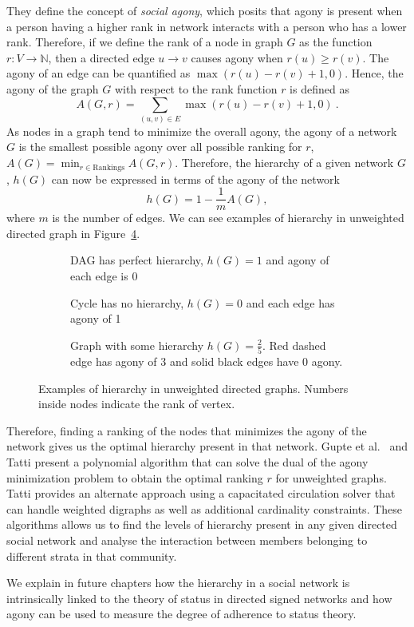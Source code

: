They define the concept of \textit{social agony}, which posits that agony is present when a person having a higher rank in network interacts with a person who has a lower rank.
Therefore, if we define the rank of a node in graph $G$ as the function $r:V \rightarrow \mathbb{N}$, then a directed edge $u \rightarrow v$ causes agony when $r(u)\geq r(v)$.
The agony of an edge can be quantified as $\max(r(u)-r(v)+1,0)$.
Hence, the agony of the graph $G$ with respect to the rank function $r$ is defined as 
\[A(G,r) =  \sum_{(u,v)\in E} \max(r(u)-r(v)+1,0) ~.\]
As nodes in a graph tend to minimize the overall agony, the agony of a network $G$ is the smallest possible agony over all possible ranking for $r$, $A(G) = \min_{r\in \text{Rankings}}A(G,r)$.
Therefore, the hierarchy of a given network $G$, $h(G)$ can now be expressed in terms of the agony of the network \[h(G)=1-\frac{1}{m}A(G),\] where $m$ is the number of edges.
We can see examples of hierarchy in unweighted directed graph in Figure~\ref{fig:hierarchy}.

 
\begin{figure}[!ht]
    \centering
    \begin{subfigure}[t]{0.5\textwidth}
        \centering
        
        \caption{DAG has perfect hierarchy, $h(G)=1$ and agony of each edge is 0}
        \label{fig:dag}
    \end{subfigure}

    \begin{subfigure}[t]{0.49\textwidth}
        \centering
        
        \caption{Cycle has no hierarchy, $h(G)=0$ and each edge has agony of 1}
        \label{fig:cycle}
    \end{subfigure}
    \begin{subfigure}[t]{0.49\textwidth}
        \centering
        
        \caption{Graph with some hierarchy $h(G)=\frac{2}{5}$. Red dashed edge has agony of 3 and solid black edges have 0 agony.  }
        \label{fig:some-hierarchy}
    \end{subfigure}
    \caption{Examples of hierarchy in unweighted directed graphs. Numbers inside nodes indicate the rank of vertex.}
    \label{fig:hierarchy} 
\end{figure}

Therefore, finding a ranking of the nodes that minimizes the agony of the network gives us the optimal hierarchy present in that network.
Gupte et al.\ \cite{gupte2011finding} and Tatti \cite{tatti2014faster} present a polynomial algorithm that can solve the dual of the agony minimization problem to obtain the optimal ranking $r$ for unweighted graphs.
Tatti \cite{tatti2017tiers} provides an alternate approach using a capacitated circulation solver that can handle weighted digraphs as well as additional cardinality constraints.
These algorithms allows us to find the levels of hierarchy present in any given directed social network and analyse the interaction between members belonging to different strata in that community.

We explain in future chapters how the hierarchy in a social network is intrinsically linked to the theory of status in directed signed networks and how agony can be used to measure the degree of adherence to status theory.




